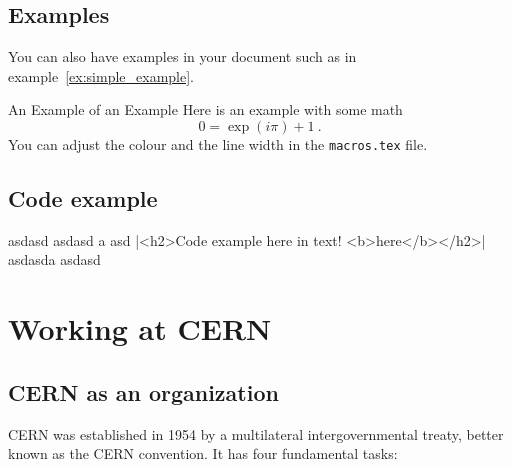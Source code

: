 



\section{Examples}
You can also have examples in your document such as in example~\ref{ex:simple_example}.
\begin{example}{An Example of an Example}
  \label{ex:simple_example}
  Here is an example with some math
  \begin{equation}
    0 = \exp(i\pi)+1\ .
  \end{equation}
  You can adjust the colour and the line width in the {\tt macros.tex} file.
\end{example}

\section{Code example}

asdasd asdasd  a asd 
|<h2>Code example here in text! <b>here</b></h2>|
asdasda 
asdasd



\chapter{Working at CERN}
\section{CERN as an organization}

CERN was established in 1954 by a multilateral intergovernmental treaty, better known as the CERN convention. 
It has four fundamental tasks:

